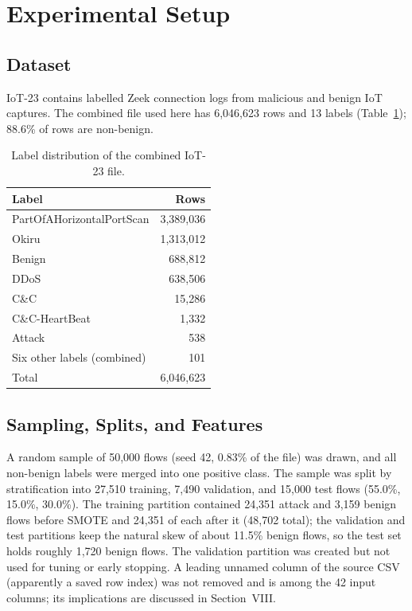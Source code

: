 \section{Experimental Setup}
\subsection{Dataset}
IoT-23 \cite{iot23} contains labelled Zeek connection logs from malicious and benign IoT captures. The combined file used here has 6,046,623 rows and 13 labels (Table~\ref{tab:labels}); 88.6\% of rows are non-benign.

\begin{table}[!t]
\centering
\caption{Label distribution of the combined IoT-23 file.}
\label{tab:labels}
\footnotesize
\begin{tabular}{@{}lr@{}}
\toprule
\textbf{Label} & \textbf{Rows} \\
\midrule
PartOfAHorizontalPortScan & 3,389,036 \\
Okiru & 1,313,012 \\
Benign & 688,812 \\
DDoS & 638,506 \\
C\&C & 15,286 \\
C\&C-HeartBeat & 1,332 \\
Attack & 538 \\
Six other labels (combined) & 101 \\
\midrule
Total & 6,046,623 \\
\bottomrule
\end{tabular}
\end{table}

\subsection{Sampling, Splits, and Features}
A random sample of 50,000 flows (seed 42, 0.83\% of the file) was drawn, and all non-benign labels were merged into one positive class. The sample was split by stratification into 27,510 training, 7,490 validation, and 15,000 test flows (55.0\%, 15.0\%, 30.0\%). The training partition contained 24,351 attack and 3,159 benign flows before SMOTE and 24,351 of each after it (48,702 total); the validation and test partitions keep the natural skew of about 11.5\% benign flows, so the test set holds roughly 1,720 benign flows. The validation partition was created but not used for tuning or early stopping. A leading unnamed column of the source CSV (apparently a saved row index) was not removed and is among the 42 input columns; its implications are discussed in Section~VIII.

